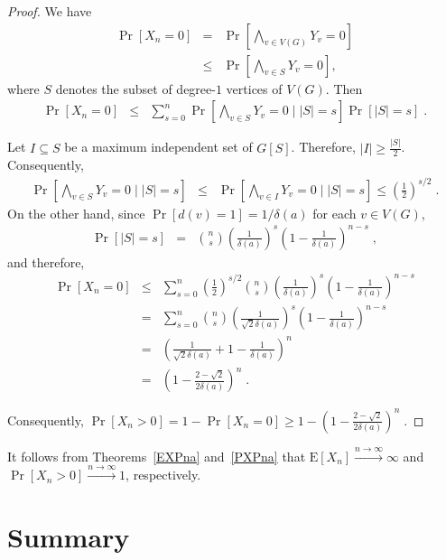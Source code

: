 \documentclass{article}
\newcommand{\st}{\;|\;}
\newcommand{\tendingtoinfty}[1]{\stackrel{#1 \rightarrow \infty}{\longrightarrow}}
\begin{document}
\begin{proof}
We have
\begin{eqnarray*}
	 \Pr[X_n = 0] & = & \Pr[\bigwedge_{v \in V(G)} Y_v = 0] \\
	& \leq & \Pr[\bigwedge_{v \in S} Y_v = 0],
\end{eqnarray*}
where $S$ denotes the subset of degree-$1$ vertices of $V(G)$. Then
\begin{eqnarray*}
	 \Pr[X_n = 0] & \leq & \sum_{s=0}^n \Pr[\bigwedge_{v \in S} Y_v = 0 \st |S|=s] \Pr[|S|=s] \;{.}	
\end{eqnarray*}

Let $I \subseteq S$ be a maximum independent set of $G[S]$. Therefore,
$|I| \geq \frac{|S|}{2}$. Consequently,
\begin{eqnarray*}
	 \Pr[\bigwedge_{v \in S} Y_v = 0 \st |S|=s] & \leq & \Pr[\bigwedge_{v \in I} Y_v = 0 \st |S|=s]  \leq \left( \frac{1}{2} \right)^{s/2} \;{.}
\end{eqnarray*}
On the other hand, since $\Pr[d(v) = 1] = 1 / \delta(a)$ for each $v \in V(G)$, 
\begin{eqnarray*}
	  \Pr[|S|=s] & = & \binom{n}{s} \left( \frac{1}{\delta(a)} \right)^{s} \left( 1 - \frac{1}{\delta(a)} \right)^{n - s} \;{,}
\end{eqnarray*}
and therefore,
\begin{eqnarray*}
	 \Pr[X_n = 0] & \leq & \sum_{s=0}^n \left( \frac{1}{2} \right)^{s/2} \binom{n}{s} \left( \frac{1}{\delta(a)} \right)^{s} \left( 1 - \frac{1}{\delta(a)} \right)^{n - s} \\
				    & = & \sum_{s=0}^n \binom{n}{s} \left( \frac{1}{\sqrt{2}\delta(a)} \right)^{s} \left( 1 - \frac{1}{\delta(a)} \right)^{n - s} \\
				    & = & \left( \frac{1}{\sqrt{2}\delta(a)} + 1 - \frac{1}{\delta(a)} \right)^{n} \\
				    & = & \left( 1 - \frac{2 - \sqrt{2}}{2\delta(a)} \right)^{n} \;{.}
\end{eqnarray*}

Consequently,
$\Pr[X_n > 0] = 1 - \Pr[X_n = 0] \geq 1 - \left( 1 - \frac{2 - \sqrt{2}}{2\delta(a)} \right)^{n} \;{.}$
\end{proof}

It follows from Theorems~\ref{EXPna} and~\ref{PXPna} that
$\mathrm{E}[X_n] \tendingtoinfty{n} \infty$ and
$\Pr[X_n > 0] \tendingtoinfty{n} 1$, respectively.

\section{Summary}
\end{document}
